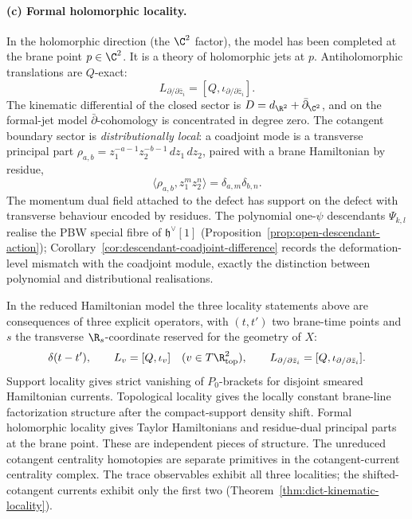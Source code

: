 \documentclass[11pt]{memoir}
\begin{document}
\paragraph{(c) Formal holomorphic locality.}
In the holomorphic direction (the $\C^2$ factor), the model has been
completed at the brane point $p\in\C^2$. It is a theory of holomorphic
jets at $p$.
Antiholomorphic translations are $Q$-exact:
$$L_{\partial/\partial\bar z_i}
  =[Q,\iota_{\partial/\partial\bar z_i}].$$
The kinematic differential of the closed sector is
$D=d_{\R^2}+\bar\partial_{\C^2}$, and on the formal-jet model
$\bar\partial$-cohomology is concentrated in degree zero. The cotangent
boundary sector is \emph{distributionally local}:
a coadjoint mode is a transverse principal part
$\rho_{a,b}=z_1^{-a-1}z_2^{-b-1}\,dz_1\,dz_2$, paired with a brane
Hamiltonian by residue,
$$\langle\rho_{a,b},z_1^mz_2^n\rangle=\delta_{a,m}\delta_{b,n}.$$
The momentum dual field attached to the defect has support on the
defect with transverse behaviour encoded by residues.
The polynomial one-$\psi$ descendants $\Psi_{k,l}$ realise the PBW
special fibre of $\mathfrak h^\vee[1]$
(Proposition~\ref{prop:open-descendant-action});
Corollary~\ref{cor:descendant-coadjoint-difference} records the
deformation-level mismatch with the coadjoint module, exactly the
distinction between polynomial and distributional realisations.

\begin{prop}
  \label{prop:three-localities}
  In the reduced Hamiltonian model the three locality statements above
  are consequences of three explicit operators, with \((t,t')\) two
  brane-time points and \(s\) the transverse \(\R_s\)-coordinate
  reserved for the geometry of \(X\):
  \[
    \delta(t-t'),\qquad
    L_v=[Q,\iota_v]\quad(v\in T\R^2_{\mathrm{top}}),\qquad
    L_{\partial/\partial\bar z_i}
      =[Q,\iota_{\partial/\partial\bar z_i}].
  \]
  Support locality gives strict vanishing of \(P_0\)-brackets for
  disjoint smeared Hamiltonian currents. Topological locality gives the
  locally constant brane-line factorization structure after the
  compact-support density shift. Formal holomorphic locality gives
  Taylor Hamiltonians and residue-dual principal parts at the brane point.
  These are independent pieces of structure.  The unreduced cotangent
  centrality homotopies are separate primitives in the cotangent-current
  centrality complex.  The trace
  observables exhibit all three localities; the shifted-cotangent
  currents exhibit only the first two
  (Theorem~\ref{thm:dict-kinematic-locality}).
\end{prop}
\end{document}
